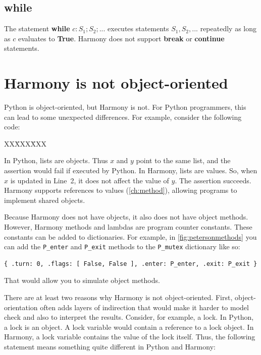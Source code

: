 \documentclass{report}
\newcommand{\harmonysource}[1]{
\begin{tabbing}
XX\=XXX\=XXX\kill
    
\end{tabbing}
}
\newenvironment{code}{
\tcolorbox
}{
\endtcolorbox
}
\begin{document}
\subsection*{\textbf{while}}

The statement \textbf{while} $c: S_1; S_2; ...$ executes statements
$S_1, S_2, ...$ repeatedly as long as $c$ evaluates to \textbf{True}.
Harmony does not support \textbf{break} or \textbf{continue} statements.

\section{Harmony is not object-oriented}

Python is object-oriented, but Harmony is not.  For Python programmers,
this can lead to some unexpected differences.
For example, consider the following code:

\begin{code}
\harmonysource{oo}
\end{code}

In Python, lists are objects.  Thus $x$ and $y$ point to the same list,
and the assertion would fail if executed by Python.
In Harmony, lists are values.  So, when $x$ is updated in Line~2, it does
not affect the value of $y$.  The assertion succeeds.
Harmony supports references to values (\autoref{ch:method}),
allowing programs to implement shared objects.

Because Harmony does not have objects, it also does not have object methods.
However, Harmony methods and lambdas are program counter constants.
These constants can be added to dictionaries.
For example, in \autoref{fig:petersonmethods}
you can add the \texttt{P\_enter} and
\texttt{P\_exit} methods to the \texttt{P\_mutex} dictionary
like so:
\begin{code}
\begin{verbatim}
{ .turn: 0, .flags: [ False, False ], .enter: P_enter, .exit: P_exit }
\end{verbatim}
\end{code}
That would allow you to simulate object methods.

There are at least two reasons why Harmony is not object-oriented.
First,
object-orientation often adds layers of indirection that would make it
harder to model check and also to interpret the results.  Consider, for example,
a lock.  In Python, a lock is an object.  A lock variable would contain a
reference to a lock object.  In Harmony, a lock variable contains the value
of the lock itself.
Thus, the following statement means something quite different in Python and
Harmony:
\end{document}
